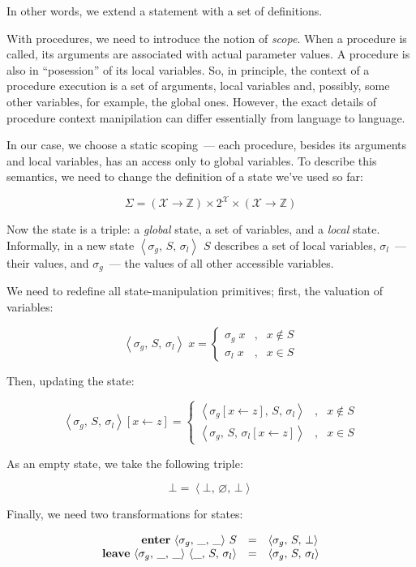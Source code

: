 \documentclass{article}
\newcommand{\inbr}[1]{\left<{#1}\right>}
\renewcommand{\emptyset}{\varnothing}
\theoremstyle{definition}
\begin{document}
In other words, we extend a statement with a set of definitions.

With procedures, we need to introduce the notion of \emph{scope}. When a procedure is called, its arguments
are associated with actual parameter values. A procedure is also in ``posession'' of its local variables.
So, in principle, the context of a procedure execution is a set of arguments, local variables and, possibly, some
other variables, for example, the global ones. However, the exact details of procedure context manipilation can
differ essentially from language to language.

In our case, we choose a static scoping~--- each procedure, besides its arguments and local variables, has an access
only to global variables.  To describe this semantics, we need to change the definition of a state we've used so far:

\[
\Sigma = (\mathscr X \to \mathbb Z) \times 2^{\mathscr X} \times (\mathscr X \to \mathbb Z)
\]

Now the state is a triple: a \emph{global} state, a set of variables, and a \emph{local} state. Informally, in a new
state $\inbr{\sigma_g,\,S,\,\sigma_l}$ $S$ describes a set of local variables, $\sigma_l$~--- their values, and $\sigma_g$~---
the values of all other accessible variables.

We need to redefine all state-manipulation primitives; first, the valuation of variables:

\[
\inbr{\sigma_g,\,S,\,\sigma_l}\;x=
  \left\{\begin{array}{rcl}
            \sigma_g\;x & , & x\not\in S\\
            \sigma_l\;x & , & x \in S
         \end{array}
  \right.
\]

Then, updating the state:

\[
\inbr{\sigma_g,\,S,\,\sigma_l}[x\gets z] =
  \left\{\begin{array}{rcl}
            \inbr{\sigma_g[x\gets z],\,S,\,\sigma_l} & , & x\not\in S\\
            \inbr{\sigma_g,\,S,\,\sigma_l[x\gets z]} & , & x \in S
         \end{array}
  \right.
\]

As an empty state, we take the following triple:

\[
\bot=\inbr{\bot,\,\emptyset,\,\bot}
\]

Finally, we need two transformations for states:

\[
\begin{array}{rcl}
  \mbox{\textbf{enter}}\,\inbr{\sigma_g,\,\_,\,\_}\,S & = & \inbr{\sigma_g,\,S,\,\bot}\\
  \mbox{\textbf{leave}}\,\inbr{\sigma_g,\,\_,\,\_}\,\inbr{\_,\,S,\,\sigma_l}& = & \inbr{\sigma_g,\,S,\,\sigma_l}
\end{array}
\]
\end{document}
